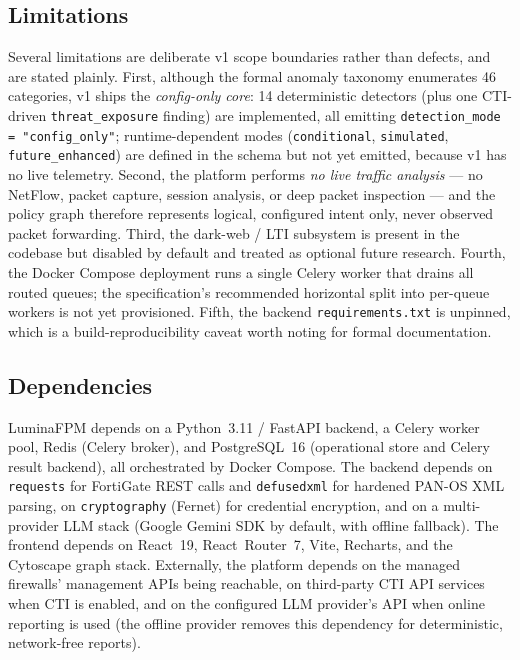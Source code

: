 \subsection{Limitations}
\label{sec:ch3-limitations}
Several limitations are deliberate v1 scope boundaries rather than defects, and are stated plainly. First, although the formal anomaly taxonomy enumerates 46 categories, v1 ships the \emph{config-only core}: 14 deterministic detectors (plus one CTI-driven \texttt{threat\_exposure} finding) are implemented, all emitting \texttt{detection\_mode = "config\_only"}; runtime-dependent modes (\texttt{conditional}, \texttt{simulated}, \texttt{future\_enhanced}) are defined in the schema but not yet emitted, because v1 has no live telemetry. Second, the platform performs \emph{no live traffic analysis} — no NetFlow, packet capture, session analysis, or deep packet inspection — and the policy graph therefore represents logical, configured intent only, never observed packet forwarding. Third, the dark-web / LTI subsystem is present in the codebase but disabled by default and treated as optional future research. Fourth, the Docker Compose deployment runs a single Celery worker that drains all routed queues; the specification's recommended horizontal split into per-queue workers is not yet provisioned. Fifth, the backend \texttt{requirements.txt} is unpinned, which is a build-reproducibility caveat worth noting for formal documentation.

\subsection{Dependencies}
\label{sec:ch3-dependencies}
LuminaFPM depends on a Python~3.11 / FastAPI backend, a Celery worker pool, Redis (Celery broker), and PostgreSQL~16 (operational store and Celery result backend), all orchestrated by Docker Compose. The backend depends on \texttt{requests} for FortiGate REST calls and \texttt{defusedxml} for hardened PAN-OS XML parsing, on \texttt{cryptography} (Fernet) for credential encryption, and on a multi-provider LLM stack (Google Gemini SDK by default, with offline fallback). The frontend depends on React~19, React~Router~7, Vite, Recharts, and the Cytoscape graph stack. Externally, the platform depends on the managed firewalls' management APIs being reachable, on third-party CTI API services when CTI is enabled, and on the configured LLM provider's API when online reporting is used (the offline provider removes this dependency for deterministic, network-free reports).

